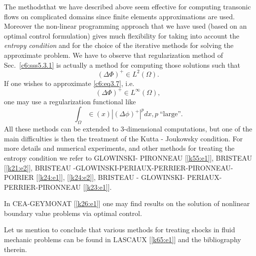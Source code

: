 The methods\pageoriginale that we have described above seem effective for computing 
transonic flows on complicated domains since finite elements 
approximations are used. Moreover the non-linear programming approach 
that we have used (based on an optimal control formulation) gives much 
flexibility for taking into account the \textit{entropy condition} and 
for the choice of the iterative methods for solving the approximate 
problem. We have to observe that regularization method of 
Sec.~\ref{c6:sss5.3.1} is actually a method for computing those 
solutions such that         
\begin{equation}
(\Delta \Phi)^+ \in L^2 (\Omega). \tag{8.1}\label{c6:eq8.1}
\end{equation}
If one wishes to approximate \eqref{c6:eq3.7}, i.e. 
\begin{equation}
(\Delta \Phi)^+ \in L^\infty (\Omega), \tag{8.2}\label{c6:eq8.2}
\end{equation}
one may use a regularization functional like 
\begin{equation}
\int_\Omega \in (x) | (\Delta \phi)^+ |^p dx, p ~\text{``large''}. 
\tag{8.3}\label{c6:eq8.3} 
\end{equation}
All these methods can be extended to 3-dimensional computations, but 
one of the main difficulties is then the treatment of the Kutta - 
Joukowsky condition. For more details and numerical experiments, and 
other methods for treating the entropy condition we refer to GLOWINSKI- 
PIRONNEAU [\ref{k55:e1}], BRISTEAU [\ref{k21:e2}], BRISTEAU 
-GLOWINSKI-PERIAUX-\break PERRIER-PIRONNEAU-POIRIER [\ref{k24:e1}],
[\ref{k24:e2}], BRISTEAU - GLOWIN\-SKI- PERIAUX-PERRIER-PIRONNEAU
[\ref{k23:e1}].      

In CEA-GEYMONAT [\ref{k26:e1}] one may find results on the solution of
nonlinear boundary value problems via optimal control.   

Let us mention to conclude that various methods for treating shocks in 
fluid mechanic problems can be found in LASCAUX [\ref{k65:e1}] and the 
bibliography therein.   
